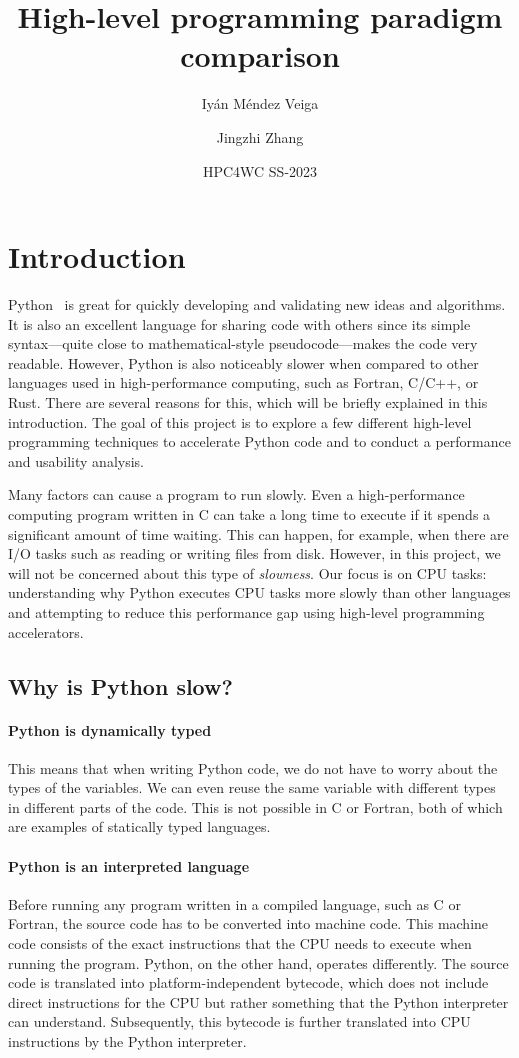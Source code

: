 \documentclass[12pt]{article}
\title{High-level programming paradigm comparison}
\author{Iyán Méndez Veiga \and Jingzhi Zhang}
\date{HPC4WC SS-2023}
\begin{document}
\maketitle
\tableofcontents

\section{Introduction}

Python~\cite{Python} is great for quickly developing and validating new ideas and algorithms. It is also an excellent language for sharing code with others since its simple syntax---quite close to mathematical-style pseudocode---makes the code very readable. However, Python is also noticeably slower when compared to other languages used in high-performance computing, such as Fortran, C/C++, or Rust. There are several reasons for this, which will be briefly explained in this introduction. The goal of this project is to explore a few different high-level programming techniques to accelerate Python code and to conduct a performance and usability analysis.

Many factors can cause a program to run slowly. Even a high-performance computing program written in C can take a long time to execute if it spends a significant amount of time waiting. This can happen, for example, when there are I/O tasks such as reading or writing files from disk. However, in this project, we will not be concerned about this type of \emph{slowness}. Our focus is on CPU tasks: understanding why Python executes CPU tasks more slowly than other languages and attempting to reduce this performance gap using high-level programming accelerators.

\subsection{Why is Python slow?}

\paragraph{Python is dynamically typed} This means that when writing Python code, we do not have to worry about the types of the variables. We can even reuse the same variable with different types in different parts of the code. This is not possible in C or Fortran, both of which are examples of statically typed languages.

\paragraph{Python is an interpreted language} Before running any program written in a compiled language, such as C or Fortran, the source code has to be converted into machine code. This machine code consists of the exact instructions that the CPU needs to execute when running the program. Python, on the other hand, operates differently. The source code is translated into platform-independent bytecode, which does not include direct instructions for the CPU but rather something that the Python interpreter can understand. Subsequently, this bytecode is further translated into CPU instructions by the Python interpreter.
\end{document}
